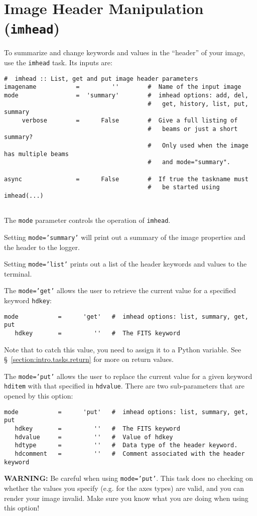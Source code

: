 \section{Image Header Manipulation ({\tt imhead})}
\label{section:analysis.imhead}

To summarize and change keywords and values in the ``header'' of
your image, use the {\tt imhead} task.  Its inputs are:
\small
\begin{verbatim}
#  imhead :: List, get and put image header parameters
imagename           =         ''        #  Name of the input image
mode                =  'summary'        #  imhead options: add, del,
                                        #   get, history, list, put, summary
     verbose        =      False        #  Give a full listing of
                                        #   beams or just a short summary? 
                                        #   Only used when the image has multiple beams
                                        #   and mode="summary".

async               =      False        #  If true the taskname must
                                        #   be started using imhead(...)


\end{verbatim}
\normalsize

The {\tt mode} parameter controls the operation of {\tt imhead}.

Setting {\tt mode='summary'} will print out a summary of the image
properties and the header to the logger.

Setting {\tt mode='list'} prints out a list of the header keywords
and values to the terminal.

The {\tt mode='get'} allows the user to retrieve the current value 
for a specified keyword {\tt hdkey}:
\small
\begin{verbatim}
mode           =      'get'   #  imhead options: list, summary, get, put
   hdkey       =         ''   #  The FITS keyword
\end{verbatim}
\normalsize
Note that to catch this value, you need to assign it to a Python
variable.
See \S~\ref{section:intro.tasks.return} for more on return values.

The {\tt mode='put'} allows the user to replace the current value 
for a given keyword {\tt hditem} with that specified in {\tt hdvalue}.  
There are two sub-parameters that are opened by this option:
\small
\begin{verbatim}
mode           =      'put'   #  imhead options: list, summary, get, put
   hdkey       =         ''   #  The FITS keyword
   hdvalue     =         ''   #  Value of hdkey
   hdtype      =         ''   #  Data type of the header keyword.
   hdcomment   =         ''   #  Comment associated with the header keyword

\end{verbatim}
\normalsize
{\bf WARNING:} Be careful when using {\tt mode='put'}.  This task does
no checking on whether the values you specify (e.g. for the axes
types) are valid, and you can render your image invalid.  Make sure you
know what you are doing when using this option!

